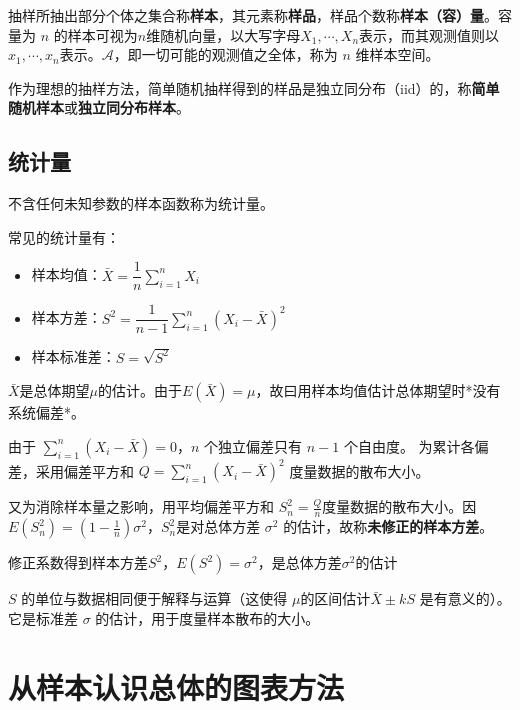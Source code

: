 \documentclass[UTF-8]{ctexbeamer}
\begin{document}
\begin{frame}
抽样所抽出部分个体之集合称\textbf{样本}，其元素称\textbf{样品}，样品个数称\textbf{样本（容）量}。容量为 $n$ 的样本可视为$n$维随机向量，以大写字母$X_1,\cdots,X_n$表示，而其观测值则以$x_1,\cdots,x_n$表示。$\mathscr{A}$，即一切可能的观测值之全体，称为 $n$ 维样本空间。

作为理想的抽样方法，简单随机抽样得到的样品是独立同分布（iid）的，称\textbf{简单随机样本}或\textbf{独立同分布样本}。
\end{frame}

\subsection{统计量}
\begin{frame}
  \begin{Def}
  不含任何未知参数的样本函数称为统计量。
  
  \end{Def}

常见的统计量有：
\begin{itemize}
\item 样本均值：$\bar X=\dfrac{1}{n}\sum\limits_{i=1}^n X_i$
\item  样本方差：$S^2=\dfrac{1}{n-1}\sum\limits_{i=1}^n (X_i-\bar X)^2$
\item  样本标准差：$S=\sqrt{S^2}$
\end{itemize}
\end{frame}

\begin{frame}
  $\bar X$是总体期望$\mu$的估计。由于$E(\bar X)=\mu$，故曰用样本均值估计总体期望时*没有系统偏差*。

  由于 $\sum^n_{i=1}(X_i-\bar X)=0$，$n$ 个独立偏差只有 $n-1$ 个自由度。
  为累计各偏差，采用偏差平方和 $Q=\sum\limits_{i=1}^n (X_i-\bar X)^2$ 度量数据的散布大小。

又为消除样本量之影响，用平均偏差平方和 $S_n^2=\frac{Q}{n}$度量数据的散布大小。因$E(S_n^2)=(1-\frac{1}{n})\sigma^2$，$S_n^2$是对总体方差 $\sigma^2$ 的估计，故称\textbf{未修正的样本方差}。

修正系数得到样本方差$S^2$，$E(S^2)=\sigma^2$，是总体方差$\sigma^2$的估计

$S$ 的单位与数据相同便于解释与运算（这使得 $\mu$的区间估计$\bar X\pm kS$ 是有意义的）。它是标准差 $\sigma$ 的估计，用于度量样本散布的大小。
\end{frame}

\section{从样本认识总体的图表方法}
\end{document}
